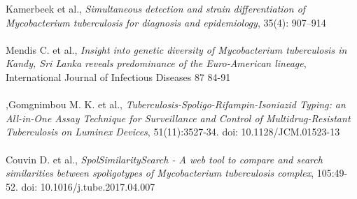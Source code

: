 \documentclass[twoside,a4paper,11pt,frenchb,openany]{report}
\begin{document}
\begin{spacing}{0.5}
\begin{thebibliography}{10}
Kamerbeek et al., \textit{Simultaneous detection and strain differentiation of Mycobacterium tuberculosis for diagnosis and epidemiology}, 35(4): 907–914\\ \\

Mendis C. et al., \textit{Insight into genetic diversity of Mycobacterium tuberculosis in Kandy, Sri Lanka reveals predominance of the Euro-American lineage}, International Journal of Infectious Diseases 87 84-91\\ \\

,Gomgnimbou M. K. et al., \textit{Tuberculosis-Spoligo-Rifampin-Isoniazid Typing: an All-in-One Assay Technique for Surveillance and Control of Multidrug-Resistant Tuberculosis on Luminex Devices}, 51(11):3527-34. doi: 10.1128/JCM.01523-13\\ \\

Couvin D. et al., \textit{SpolSimilaritySearch - A web tool to compare and search similarities between spoligotypes of Mycobacterium tuberculosis complex}, 105:49-52. doi: 10.1016/j.tube.2017.04.007




			

\end{thebibliography}
\end{spacing}




		



\printindex
\end{document}
